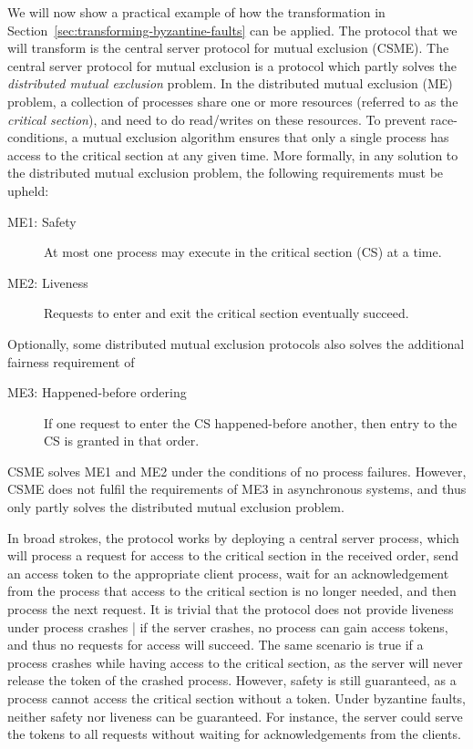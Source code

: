 \documentclass{article}
\begin{document}
		We will now show a practical example of how the transformation in Section~\ref{sec:transforming-byzantine-faults} can be applied.
		The protocol that we will transform is the central server protocol for mutual exclusion (CSME).
		The central server protocol for mutual exclusion is a protocol which partly solves the \textit{distributed mutual exclusion} problem.
		In the distributed mutual exclusion (ME) problem, a collection of processes share one or more resources (referred to as the \textit{critical section}), and need to do read/writes on these resources.
		To prevent race-conditions, a mutual exclusion algorithm ensures that only a single process has access to the critical section at any given time.
		More formally, in any solution to the distributed mutual exclusion problem, the following requirements must be upheld:
		\begin{description}
			\item[ME1: Safety] At most one process may execute in the critical section (CS) at a time.
			\item[ME2: Liveness] Requests to enter and exit the critical section eventually succeed.
		\end{description}
		Optionally, some distributed mutual exclusion protocols also solves the additional fairness requirement of
		\begin{description}
			\item[ME3: Happened-before ordering] If one request to enter the CS happened-before another, then entry to the CS is granted in that order.
		\end{description}
		CSME solves ME1 and ME2 under the conditions of no process failures.
		However, CSME does not fulfil the requirements of ME3 in asynchronous systems, and thus only partly solves the distributed mutual exclusion problem.

		In broad strokes, the protocol works by deploying a central server process, which will process a request for access to the critical section in the received order, send an access token to the appropriate client process, wait for an acknowledgement from the process that access to the critical section is no longer needed, and then process the next request.
		It is trivial that the protocol does not provide liveness under process crashes | if the server crashes, no process can gain access tokens, and thus no requests for access will succeed.
		The same scenario is true if a process crashes while having access to the critical section, as the server will never release the token of the crashed process.
		However, safety is still guaranteed, as a process cannot access the critical section without a token.
		Under byzantine faults, neither safety nor liveness can be guaranteed.
		For instance, the server could serve the tokens to all requests without waiting for acknowledgements from the clients.
\end{document}
